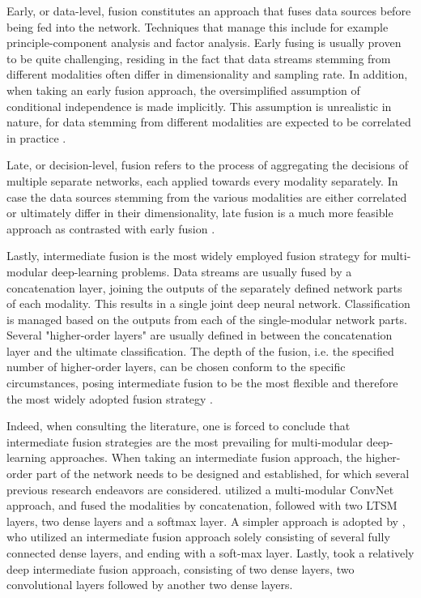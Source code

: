 \documentclass[12pt]{article}
\begin{document}
Early, or data-level, fusion constitutes an approach that fuses data sources before being fed into the network. Techniques that manage this include for example principle-component analysis and factor analysis. Early fusing is usually proven to be quite challenging, residing in the fact that data streams stemming from different modalities often differ in dimensionality and sampling rate. In addition, when taking an early fusion approach, the oversimplified assumption of conditional independence is made implicitly. This assumption is unrealistic in nature, for data stemming from different modalities are expected to be correlated in practice \cite{ramachandram2017deep}. 

Late, or decision-level, fusion refers to the process of aggregating the decisions of multiple separate networks, each applied towards every modality separately. In case the data sources stemming from the various modalities are either correlated or ultimately differ in their dimensionality, late fusion is a much more feasible approach as contrasted with early fusion \cite{ramachandram2017deep}.

Lastly, intermediate fusion is the most widely employed fusion strategy for multi-modular deep-learning problems. Data streams are usually fused by a concatenation layer, joining the outputs of the separately defined network parts of each modality. This results in a single joint deep neural network. Classification is managed based on the outputs from each of the single-modular network parts. Several "higher-order layers" are usually defined in between the concatenation layer and the ultimate classification. The depth of the fusion, i.e. the specified number of higher-order layers, can be chosen conform to the specific circumstances, posing intermediate fusion to be the most flexible and therefore the most widely adopted fusion strategy \cite{ramachandram2017deep}.

Indeed, when consulting the literature, one is forced to conclude that intermediate fusion strategies are the most prevailing for multi-modular deep-learning approaches. When taking an intermediate fusion approach, the higher-order part of the network needs to be designed and established, for which several previous research endeavors are considered.   utilized a multi-modular ConvNet approach, and fused the modalities by concatenation, followed with two LTSM layers, two dense layers and a softmax layer. A simpler approach is adopted by , who utilized an intermediate fusion approach solely consisting of several fully connected dense layers, and ending with a soft-max layer. Lastly,  took a relatively deep intermediate fusion approach, consisting of two dense layers, two convolutional layers followed by another two dense layers.  
\end{document}
